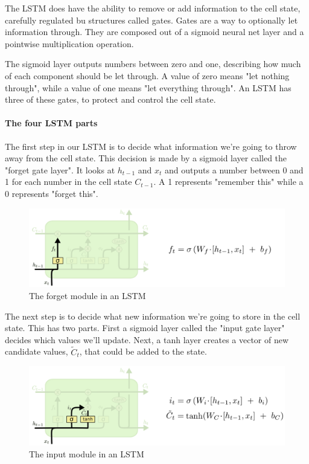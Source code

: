 \documentclass{article}
\begin{document}
The LSTM does have the ability to remove or add information to the cell state, carefully regulated bu structures called gates.
Gates are a way to optionally let information through.
They are composed out of a sigmoid neural net layer and a pointwise multiplication operation.

The sigmoid layer outputs numbers between zero and one, describing how much of each component should be let through. A value of zero means "let nothing through", while a value of one means "let everything through".
An LSTM has three of these gates, to protect and control the cell state.

\paragraph{The four LSTM parts}
The first step in our LSTM is to decide what information we're going to throw away from the cell state.
This decision is made by a sigmoid layer called the "forget gate layer".
It looks at $h_{t-1}$ and $x_t$ and outputs a number between 0 and 1 for each number in the cell state $C_{t-1}$.
A 1 represents "remember this" while a 0 represents "forget this".

\begin{figure}[htbp]
  \centering
  \includegraphics[width=0.6\linewidth]{img/lstm_forget.png}
  \caption{The forget module in an LSTM}
  \label{fig:lstm_forget}
\end{figure}

The next step is to decide what new information we're going to store in the cell state.
This has two parts.
First a sigmoid layer called the "input gate layer" decides which values we'll update.
Next, a tanh layer creates a vector of new candidate values, $\tilde{C}_t$, that could be added to the state.

\begin{figure}[htbp]
  \centering
  \includegraphics[width=0.6\linewidth]{img/lstm_input.png}
  \caption{The input module in an LSTM}
  \label{fig:lstm_input}
\end{figure}
\end{document}
